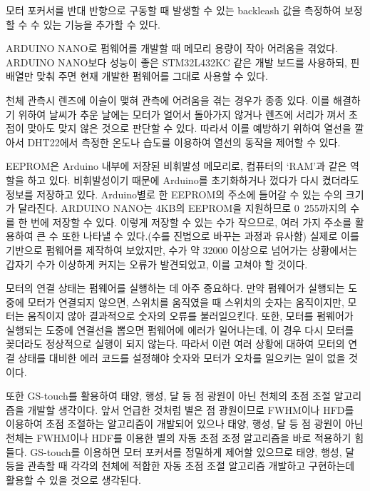\begin{description}[font=$\bullet$~\normalfont\scshape\color{red!50!black}]
	
	\item [Backleash 보정 기능 추가] 모터 포커서를 반대 반향으로 구동할 때 발생할 수 있는 backleash 값을 측정하여 보정할 수 수 있는 기능을 추가할 수 있다.
	
	\item [MCU 변경] ARDUINO NANO로 펌웨어를 개발할 때 메모리 용량이 작아 어려움을 겪었다. ARDUINO NANO보다 성능이 좋은 STM32L432KC 같은 개발 보드를 사용하되, 핀 배열만 맞춰 주면 현재 개발한 펌웨어를 그대로 사용할 수 있다.
	
	\item [Heating system 추가] 천체 관측시 렌즈에 이슬이 맺혀 관측에 어려움을 겪는 경우가 종종 있다. 이를 해결하기 위하여 날씨가 추운 날에는 모터가 얼어서 돌아가지 않거나 렌즈에 서리가 껴서 초점이 맞아도 맞지 않은 것으로 판단할 수 있다. 따라서 이를 예방하기 위하여 열선을 깔아서 DHT22에서 측정한 온도나 습도를 이용하여 열선의 동작을 제어할 수 있다. 
	
	\item [EEPROM 활용] EEPROM은 Arduino 내부에 저장된 비휘발성 메모리로, 컴퓨터의 ‘RAM’과 같은 역할을 하고 있다. 비휘발성이기 때문에 Arduino를 초기화하거나 껐다가 다시 켰더라도 정보를 저장하고 있다. 
	Arduino별로 한 EEPROM의 주소에 들어갈 수 있는 수의 크기가 달라진다. ARDUINO NANO는 4KB의 EEPROM을 지원하므로 0~255까지의 수를 한 번에 저장할 수 있다. 이렇게 저장할 수 있는 수가 작으므로, 여러 가지 주소를 활용하여 큰 수 또한 나타낼 수 있다.(수를 진법으로 바꾸는 과정과 유사함) 실제로 이를 기반으로 펌웨어를 제작하여 보았지만, 수가 약 32000 이상으로 넘어가는 상황에서는 갑자기 수가 이상하게 커지는 오류가 발견되었고, 이를 고쳐야 할 것이다.
	
	\item [모터 연결 상태 체크 기능 추가] 모터의 연결 상태는 펌웨어를 실행하는 데 아주 중요하다. 만약 펌웨어가 실행되는 도중에 모터가 연결되지 않으면, 스위치를 움직였을 때 스위치의 숫자는 움직이지만, 모터는 움직이지 않아 결과적으로 숫자의 오류를 불러일으킨다. 또한, 모터를 펌웨어가 실행되는 도중에 연결선을 뽑으면 펌웨어에 에러가 일어나는데, 이 경우 다시 모터를 꽂더라도 정상적으로 실행이 되지 않는다. 따라서 이런 여러 상황에 대하여 모터의 연결 상태를 대비한 에러 코드를 설정해야 숫자와 모터가 오차를 일으키는 일이 없을 것이다.
\end{description}

또한 GS-touch를 활용하여 태양, 행성, 달 등 점 광원이 아닌 천체의 초점 조절 알고리즘을 개발할 생각이다. 앞서 언급한 것처럼 별은 점 광원이므로 FWHM이나 HFD를 이용하여 초점 조절하는 알고리즘이 개발되어 있으나 태양, 행성, 달 등 점 광원이 아닌 천체는 FWHM이나 HDF를 이용한 별의 자동 초점 조정 알고리즘을 바로 적용하기 힘들다. GS-touch를 이용하면 모터 포커서를 정밀하게 제어할 있으므로 태양, 행성, 달 등을 관측할 때 각각의 천체에 적합한 자동 초점 조절 알고리즘 개발하고 구현하는데 활용할 수 있을 것으로 생각된다. 
